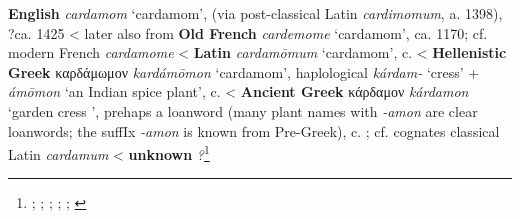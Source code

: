 \begin{etymology}\label{ety:cardamom}
\textbf{English} \textit{cardamom} `cardamom', (via post-classical Latin \textit{cardimomum}, a. 1398), ?ca. 1425
< later also from \textbf{Old French} \textit{cardemome} `cardamom', ca. 1170; cf. modern French \textit{cardamome}
< \textbf{Latin} \textit{cardamōmum} `cardamom',  c. \AD{}
< \textbf{Hellenistic Greek} {καρδάμωμον} \textit{kardámōmon} `cardamom', haplological  \textit{kárdam-} `cress' +  \textit{ámōmon} `an Indian spice plant',  c. \BC{}
< \textbf{Ancient Greek} {κάρδαμον} \textit{kárdamon} `garden cress ', prehaps a loanword (many plant names with \textit{-amon} are clear loanwords; the suffIx \textit{-amon} is known from Pre-Greek),  c. \BC{}; cf. cognates classical Latin \textit{cardamum}
< \textbf{unknown} \textit{?}\footnote{\textcite[s.v. cardamom]{oed}; \textcite[s.v. cardamome]{tlfi}; \textcite[s.v. cardamomum]{lewis_latin_1879}; \textcite[s.v. καρδάμωμον]{liddell_greek-english_1940}; \textcite[s.v. κάρδαμον]{liddell_greek-english_1940}; \textcite[644]{beekes_etymological_2010}}
\end{etymology}